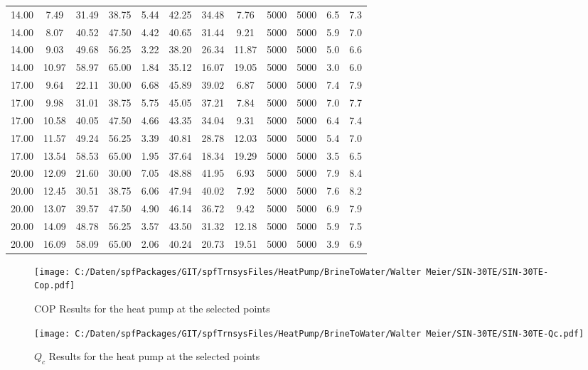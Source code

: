 \documentclass[english]{SPFShortReport}
\begin{document}
\begin{table}[!ht]
\begin{small}
\begin{center}
{\begin{tabular}{l | c c c c c c c c c c c }
14.00 & 7.49 & 31.49 & 38.75 & 5.44 & 42.25 & 34.48 & 7.76 & 5000 & 5000 & 6.5 & 7.3\\ 
14.00 & 8.07 & 40.52 & 47.50 & 4.42 & 40.65 & 31.44 & 9.21 & 5000 & 5000 & 5.9 & 7.0\\ 
14.00 & 9.03 & 49.68 & 56.25 & 3.22 & 38.20 & 26.34 & 11.87 & 5000 & 5000 & 5.0 & 6.6\\ 
14.00 & 10.97 & 58.97 & 65.00 & 1.84 & 35.12 & 16.07 & 19.05 & 5000 & 5000 & 3.0 & 6.0\\ 
17.00 & 9.64 & 22.11 & 30.00 & 6.68 & 45.89 & 39.02 & 6.87 & 5000 & 5000 & 7.4 & 7.9\\ 
17.00 & 9.98 & 31.01 & 38.75 & 5.75 & 45.05 & 37.21 & 7.84 & 5000 & 5000 & 7.0 & 7.7\\ 
17.00 & 10.58 & 40.05 & 47.50 & 4.66 & 43.35 & 34.04 & 9.31 & 5000 & 5000 & 6.4 & 7.4\\ 
17.00 & 11.57 & 49.24 & 56.25 & 3.39 & 40.81 & 28.78 & 12.03 & 5000 & 5000 & 5.4 & 7.0\\ 
17.00 & 13.54 & 58.53 & 65.00 & 1.95 & 37.64 & 18.34 & 19.29 & 5000 & 5000 & 3.5 & 6.5\\ 
20.00 & 12.09 & 21.60 & 30.00 & 7.05 & 48.88 & 41.95 & 6.93 & 5000 & 5000 & 7.9 & 8.4\\ 
20.00 & 12.45 & 30.51 & 38.75 & 6.06 & 47.94 & 40.02 & 7.92 & 5000 & 5000 & 7.6 & 8.2\\ 
20.00 & 13.07 & 39.57 & 47.50 & 4.90 & 46.14 & 36.72 & 9.42 & 5000 & 5000 & 6.9 & 7.9\\ 
20.00 & 14.09 & 48.78 & 56.25 & 3.57 & 43.50 & 31.32 & 12.18 & 5000 & 5000 & 5.9 & 7.5\\ 
20.00 & 16.09 & 58.09 & 65.00 & 2.06 & 40.24 & 20.73 & 19.51 & 5000 & 5000 & 3.9 & 6.9\\ 
\hline
\hline
\end{tabular}
}
\label{ResultsTable}
\end{center}
\end{small}
\end{table}
\begin{figure}[!ht]
\begin{center}
\texttt{[image: C:/Daten/spfPackages/GIT/spfTrnsysFiles/HeatPump/BrineToWater/Walter Meier/SIN-30TE/SIN-30TE-Cop.pdf]}
\caption{COP Results for the heat pump at the selected points}
\label{COPFig}
\end{center}
\end{figure}
\begin{figure}[!ht]
\begin{center}
\texttt{[image: C:/Daten/spfPackages/GIT/spfTrnsysFiles/HeatPump/BrineToWater/Walter Meier/SIN-30TE/SIN-30TE-Qc.pdf]}
\caption{$Q_c$ Results for the heat pump at the selected points}
\label{QcFig}
\end{center}
\end{figure}
\end{document}

